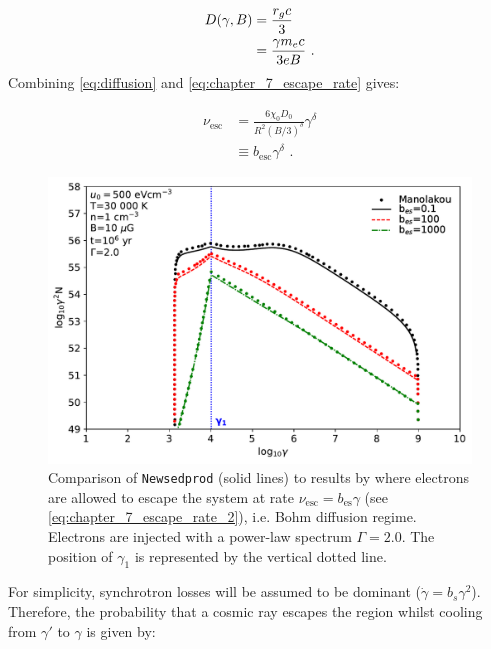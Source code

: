 \begin{equation}
    \begin{aligned}
    D\qty(\gamma,B)&=\frac{r_gc}{3} \\
    &=\frac{\gamma m_e c}{3e B}\text{ .}
    \end{aligned}
\end{equation}
\noindent Combining \autoref{eq:diffusion} and \autoref{eq:chapter_7_escape_rate} gives:

\begin{equation}
    \begin{aligned}
    \nu_\text{esc}&=\frac{6\chi_0D_0}{R^2 (B/3)^\delta} \gamma^\delta \\
    &\equiv b_\text{esc} \gamma^\delta\text{ .}
    \end{aligned} \label{eq:chapter_7_escape_rate_2}
\end{equation}

\begin{figure}[b!]
    \centering
    \includegraphics[width=\textwidth]{07_Particle_Evolution/Images/Code/manolakou_ecape.pdf}
    \caption{Comparison of {\tt Newsedprod} (solid lines) to results by \cite{2007A&A...474..689M} where electrons are allowed to escape the system at rate $\nu_\text{esc}= b_\text{es}\gamma$ (see \autoref{eq:chapter_7_escape_rate_2}), i.e. Bohm diffusion regime. Electrons are injected with a power-law spectrum $\Gamma=2.0$. The position of $\gamma_1$ is represented by the vertical dotted line.}
    \label{fig:chapter_7_manolakou_escape}
\end{figure}

For simplicity, synchrotron losses will be assumed to be dominant ($\dot{\gamma}=b_s\gamma^2$). Therefore, the probability that a cosmic ray escapes the region whilst cooling from $\gamma'$ to $\gamma$ is given by:


